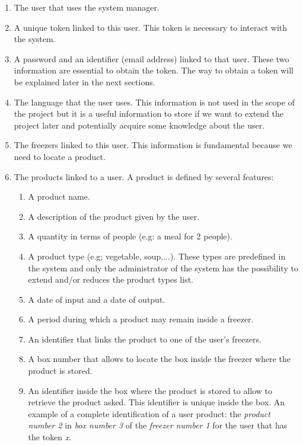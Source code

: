 \begin{enumerate}
\item The user that uses the system manager.
\item A unique token linked to this user. This token is necessary to interact with the system.
\item A password and an identifier (email address) linked to that user. These two information are essential to obtain the token. The way to obtain a token will be explained later in the next sections.
\item The language that the user uses. This information is not used in the scope of the project but it is a useful information to store if we want to extend the project later and potentially acquire some knowledge about the user.
\item The freezers linked to this user. This information is fundamental because we need to locate a product.
\item The products linked to a user. A product is defined by several features: 
\begin{enumerate}
\item A product name.
\item A description of the product given by the user.
\item A quantity in terms of people (e.g: a meal for 2 people).
\item A product type (e.g; vegetable, soup,...). These types are predefined in the system and only the administrator of the system has the possibility to extend and/or reduces the product types list.
\item A date of input and a date of output.
\item A period during which a product may remain inside a freezer.
\item An identifier that links the product to one of the user's freezers.
\item A box number that allows to locate the box inside the freezer where the  product is stored.
\item An identifier inside the box where the product is stored to allow to retrieve the product asked. This identifier is unique inside the box. An example of a complete identification of a user product: the \textit{product number 2} in \textit{box number 3} of the \textit{freezer number 1} for the user that has the token \textit{x}.
\end{enumerate}
\end{enumerate}

